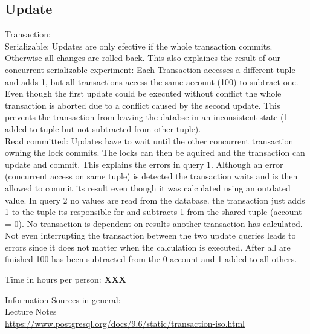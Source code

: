 \documentclass[11pt]{scrartcl}
\begin{document}
\subsection*{Update}
Transaction:\\
Serializable: Updates are only efective if the whole transaction commits. Otherwise all changes are rolled back. This also explaines the result of our concurrent serializable experiment: Each Transaction accesses a different tuple and adds 1, but all transactions access the same account (100) to subtract one. Even though the first update could be executed without conflict the whole transaction is aborted due to a conflict caused by the second update. This prevents the transaction from leaving the databse in an inconsistent state (1 added to tuple but not subtracted from other tuple).\\

Read committed: Updates have to wait until the other concurrent transaction owning the lock commits. The locks can then be aquired and the transaction can update and commit. This explains the errors in query 1. Although an error (concurrent access on same tuple) is detected the transaction waits and is then allowed to commit its result even though it was calculated using an outdated value. In query 2 no values are read from the database. the transaction just adds 1 to the tuple its responsible for and subtracts 1 from the shared tuple (account = 0). No transaction is dependent on results another transaction has calculated. Not even interrupting the transaction between the two update queries leads to errors since it does not matter when the calculation is executed. After all are finished 100 has been subtracted from the 0 account and 1 added to all others.


\bigskip

\noindent Time in hours per person: {\bf XXX}

\bigskip

Information Sources in general:\\
Lecture Notes\\
\url{https://www.postgresql.org/docs/9.6/static/transaction-iso.html}
\end{document}
